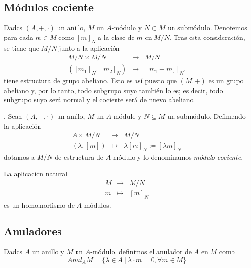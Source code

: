 \documentclass[../main.tex]{subfiles}
\begin{document}
\subsection{Módulos cociente}
Dados $(A,+,\cdot)$ un anillo, $M$ un $A$-módulo y $N\subset M$ un submódulo. Denotemos para cada $m\in M$ como $[m]_N$ a la clase de $m$ en $M/N$. Tras esta consideración, se tiene que $M/N$ junto a la aplicación
$$\begin{array}{rcl}
M/N\times M/N&\longrightarrow&M/N\\
([m_1]_N,[m_2]_N)&\longmapsto&[m_1+m_2]_N.
\end{array}$$
tiene estructura de grupo abeliano. Esto es así puesto que $(M,+)$ es un grupo abeliano y, por lo tanto, todo subgrupo suyo también lo es; es decir, todo subgrupo suyo será normal y el cociente será de nuevo abeliano.

\begin{definition}. Sean $(A,+,\cdot)$ un anillo, $M$ un $A$-módulo y $N\subseteq M$ un submódulo. Definiendo la aplicación
	$$\begin{array}{rcl}
	A\times M/N&\longrightarrow&M/N\\
	(\lambda,[m])&\longmapsto&\lambda[m]_N:=[\lambda m]_N
	\end{array}$$
	dotamos a $M/N$ de estructura de $A$-módulo y lo denominamos \textit{módulo cociente}.
\end{definition}

\begin{remark} La aplicación natural
	$$\begin{array}{rcl}
	M&\longrightarrow&M/N\\
	m&\longmapsto&[m]_N
	\end{array}$$
	es un homomorfismo de $A$-módulos.
\end{remark}
\subsection{Anuladores}
\begin{definition} Dados $A$ un anillo y $M$ un $A$-módulo, definimos el anulador de $A$ en $M$ como$$Anul_A M = \{\lambda\in A\ |\  \lambda\cdot m=0, \forall m\in M\}$$
\end{definition}
\end{document}
